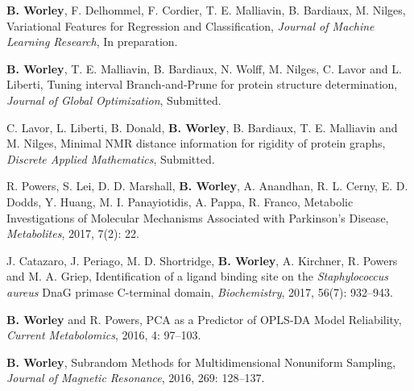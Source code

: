 \documentclass[letterpaper]{article}
\renewenvironment{itemize}{
  \begin{list}{}{
    \setlength{\leftmargin}{1.5em}
  }
}{
  \end{list}
}
\begin{document}
\begin{itemize}
\item \textbf{B. Worley}, F. Delhommel, F. Cordier, T. E. Malliavin,
 B. Bardiaux, M. Nilges,
 Variational Features for Regression and Classification,
 {\it Journal of Machine Learning Research}, In preparation.
\end{itemize}

\begin{itemize}
\item \textbf{B. Worley}, T. E. Malliavin, B. Bardiaux, N. Wolff,
 M. Nilges, C. Lavor and L. Liberti, Tuning interval Branch-and-Prune
 for protein structure determination, {\it Journal of Global Optimization},
 Submitted.
\end{itemize}

\begin{itemize}
\item C. Lavor, L. Liberti, B. Donald, \textbf{B. Worley},
 B. Bardiaux, T. E. Malliavin and M. Nilges, Minimal NMR distance information
 for rigidity of protein graphs, {\it Discrete Applied Mathematics},
 Submitted.
\end{itemize}

\begin{itemize}
\item R. Powers, S. Lei, D. D. Marshall, \textbf{B. Worley}, A. Anandhan,
 R. L. Cerny, E. D. Dodds, Y. Huang, M. I. Panayiotidis, A. Pappa,
 R. Franco, Metabolic Investigations of Molecular Mechanisms Associated
 with Parkinson's Disease, {\it Metabolites}, 2017, 7(2): 22.
\end{itemize}

\begin{itemize}
\item J. Catazaro, J. Periago, M. D. Shortridge, \textbf{B. Worley},
 A. Kirchner, R. Powers and M. A. Griep,
 Identification of a ligand binding site on the
 {\it Staphylococcus aureus} DnaG primase C-terminal domain,
 {\it Biochemistry}, 2017, 56(7): 932--943.
\end{itemize}

\begin{itemize}
\item \textbf{B. Worley} and R. Powers,
 PCA as a Predictor of OPLS-DA Model Reliability,
 {\it Current Metabolomics}, 2016, 4: 97--103.
\end{itemize}

\begin{itemize}
\item \textbf{B. Worley},
 Subrandom Methods for Multidimensional Nonuniform Sampling,
 {\it Journal of Magnetic Resonance}, 2016, 269: 128--137.
\end{itemize}
\end{document}
